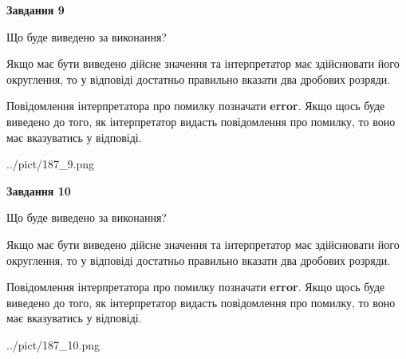 \documentclass[12pt, ukrainian]{article}
\begin{document}
{\begin {Large}
{\begin {center}\textbf{Завдання 9}\end {center}}\par
Що буде виведено за виконання? \par

Якщо має бути виведено дійсне значення та інтерпретатор має здійснювати його округлення, 
то у відповіді достатньо правильно вказати два дробових розряди.

Повідомлення інтерпретатора про помилку позначати \textbf{error}.
Якщо щось буде виведено до того, як інтерпретатор видасть повідомлення про помилку, 
то воно має вказуватись у відповіді. \par

\begin{center}
	{../pict/187_9.png}
\end{center}
\newpage

{\begin {center}\textbf{Завдання 10}\end {center}}\par
Що буде виведено за виконання? \par

Якщо має бути виведено дійсне значення та інтерпретатор має здійснювати його округлення, 
то у відповіді достатньо правильно вказати два дробових розряди.

Повідомлення інтерпретатора про помилку позначати \textbf{error}.
Якщо щось буде виведено до того, як інтерпретатор видасть повідомлення про помилку, 
то воно має вказуватись у відповіді. \par

\begin{center}
	{../pict/187_10.png}
\end{center}
\newpage

\end {Large}}
\end{document}
